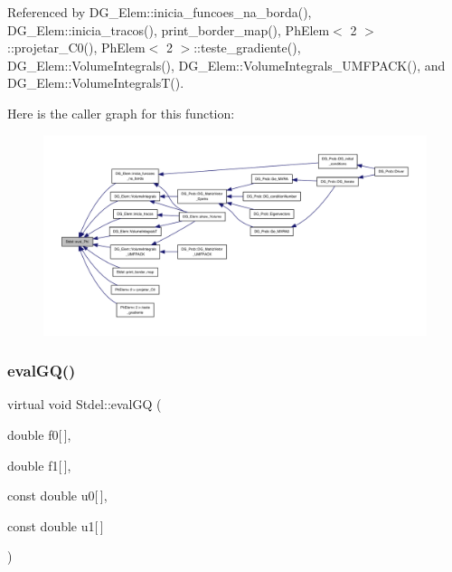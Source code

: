 Referenced by D\+G\+\_\+\+Elem\+::inicia\+\_\+funcoes\+\_\+na\+\_\+borda(), D\+G\+\_\+\+Elem\+::inicia\+\_\+tracos(), print\+\_\+border\+\_\+map(), Ph\+Elem$<$ 2 $>$\+::projetar\+\_\+\+C0(), Ph\+Elem$<$ 2 $>$\+::teste\+\_\+gradiente(), D\+G\+\_\+\+Elem\+::\+Volume\+Integrals(), D\+G\+\_\+\+Elem\+::\+Volume\+Integrals\+\_\+\+U\+M\+F\+P\+A\+C\+K(), and D\+G\+\_\+\+Elem\+::\+Volume\+Integrals\+T().

Here is the caller graph for this function\+:
\nopagebreak
\begin{figure}[H]
\begin{center}
\leavevmode
\includegraphics[width=350pt]{classStdel_a2aa6ea12ceaa1fa4a7f63909ce41bc0b_icgraph}
\end{center}
\end{figure}
\mbox{\label{classStdel_aac725224c4c3433228ca6841fe7aba49}} 
\subsubsection{\texorpdfstring{eval\+G\+Q()}{evalGQ()}\hspace{0.1cm}{\footnotesize\ttfamily [1/2]}}
{\footnotesize\ttfamily virtual void Stdel\+::eval\+GQ (\begin{DoxyParamCaption}\item[{double}]{f0\mbox{[}$\,$\mbox{]},  }\item[{double}]{f1\mbox{[}$\,$\mbox{]},  }\item[{const double}]{u0\mbox{[}$\,$\mbox{]},  }\item[{const double}]{u1\mbox{[}$\,$\mbox{]} }\end{DoxyParamCaption})\hspace{0.3cm}{\ttfamily [pure virtual]}}




